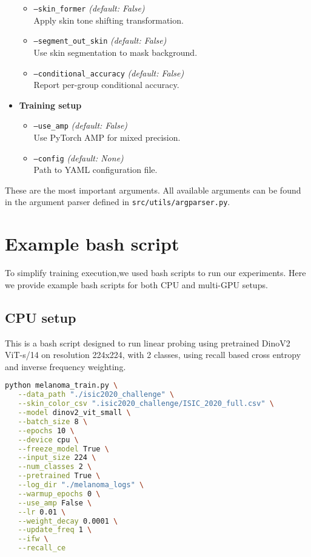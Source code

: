 \begin{itemize}
\begin{itemize}
        \item \texttt{---skin\_former} \hfill \textit{(default: False)} \\
        Apply skin tone shifting transformation.

        \item \texttt{---segment\_out\_skin} \hfill \textit{(default: False)} \\
        Use skin segmentation to mask background.

        \item \texttt{---conditional\_accuracy} \hfill \textit{(default: False)} \\
        Report per-group conditional accuracy.
    \end{itemize}

    \item \textbf{Training setup}
    \begin{itemize}
        \item \texttt{---use\_amp} \hfill \textit{(default: False)} \\
        Use PyTorch AMP for mixed precision.

        \item \texttt{---config} \hfill \textit{(default: None)} \\
        Path to YAML configuration file.
    \end{itemize}

\end{itemize}

These are the most important arguments. All available arguments can be found in the argument parser defined in \texttt{src/utils/argparser.py}.

\section{Example bash script}
To simplify training execution,we used bash scripts to run our experiments. Here we provide example bash scripts for both CPU and multi-GPU setups.

\subsection{CPU setup}

This is a bash script designed to run linear probing using pretrained  DinoV2 ViT-s/14 on resolution 224x224, with 2 classes, using recall based cross entropy and inverse frequency weighting.
\begin{lstlisting}[language=bash, caption={Example CPU Training Script}, label={lst:cpu_script}]
python melanoma_train.py \
   --data_path "./isic2020_challenge" \
   --skin_color_csv ".isic2020_challenge/ISIC_2020_full.csv" \
   --model dinov2_vit_small \
   --batch_size 8 \
   --epochs 10 \
   --device cpu \
   --freeze_model True \
   --input_size 224 \
   --num_classes 2 \
   --pretrained True \
   --log_dir "./melanoma_logs" \
   --warmup_epochs 0 \
   --use_amp False \
   --lr 0.01 \
   --weight_decay 0.0001 \
   --update_freq 1 \
   --ifw \
   --recall_ce 
\end{lstlisting}

